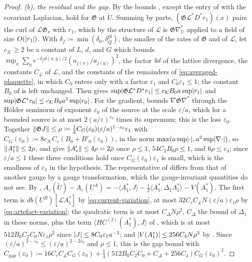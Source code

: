 \documentclass[11pt]{preprint}
\DeclarePairedDelimiter{\abs}{\lvert}{\rvert}
\DeclarePairedDelimiter{\norm}{\lVert}{\rVert}
\numberwithin{equation}{section}
\theoremstyle{definition}
\theoremstyle{remark}
\theoremstyle{plain}
\begin{document}
\begin{proof}
\emph{(b), the residual and the gap.} By \cite[Theorem~3.13, p.~426]{BalabanPBG} the bounds \cite[(3.42)--(3.47)]{BalabanPBG}, except the entry of \cite[(3.42)]{BalabanPBG} with the covariant Laplacian, hold for $\mathfrak G$ at $\tilde U$. Summing by parts, $(\mathfrak G\mathcal L^*D^*r_1)(x)$ pairs the curl of $\mathcal L\mathfrak G_x$ with $r_1$, which by the structure of $\mathcal L$ is $\mathfrak G\nabla^*_U$ applied to a field of size $O(\abs{r_1})$. With $\delta_f \coloneqq \min(\delta_0, \delta^{\mathrm{pl}}_Q)$, the smaller of the rates of $\mathfrak G$ and of $\mathcal L$, let $c_{\mathcal K} \geq 2$ be a constant of $L$, $d$, and $G$ which bounds $\sup_x\sum_ye^{-\delta_fd(x,y)/2}(a_{j(x)}/a_{j(y)})^2$, the factor $4d$ of the lattice divergence, the constants $C_{\mathcal L}$ of $\mathcal L$, and the constants of the remainders of \eqref{eq:averaged-plaquette}, in which $C_0$ enters only with a factor $\varepsilon_1$ and $C_0\varepsilon_1 \leq 1$; the constant $B_0$ of \cite[(3.42)]{BalabanPBG} is left unchanged. Then \cite[(3.42)]{BalabanPBG} gives $\sup\abs{\mathfrak G\mathcal L^*D^*r_1} \leq c_{\mathcal K}B_0a\sup\abs{r_1}$ and $\sup\abs{\mathfrak G\mathcal L^*r_0} \leq c_{\mathcal K}B_0a^2\sup\abs{r_0}$. For the gradient, \cite[(3.44)]{BalabanPBG} bounds $\nabla\mathfrak G\nabla^*$ through the H\"older seminorm of exponent $\varepsilon_0$ of the source at the scale $\varepsilon/a$, which for a bounded source is at most $2(a/\varepsilon)^{\varepsilon_0}$ times its supremum; this is the loss $\varepsilon_0$. Together $\norm{\mathfrak GJ} \leq \rho \coloneqq \frac12C_G(\varepsilon_0)(\varepsilon/a)^{1-\varepsilon_0}\varepsilon_1$ with $C_G(\varepsilon_0) \coloneqq 8c_{\mathcal K}C_r(B_0 + B'_0(\varepsilon_0))$, in the norm $\max(a\sup\abs\cdot, a^2\sup\abs{\nabla\cdot})$, so $\norm{A_1^*} \leq 2\rho$, and \cite[(57), (58), pp.~286--287]{BalabanVAR} give $\norm{A'_*} \leq 4\rho = 2\bar\rho$ once $\rho \leq 1$, $54C_2B_0\rho \leq 1$, and $6\rho \leq c_4$; since $\varepsilon/a \leq 1$ these three conditions hold once $C_G(\varepsilon_0)\varepsilon_1$ is small, which is the smallness of $\varepsilon_1$ in the hypothesis. The representative of \cite[Proposition~5]{BalabanVAR} differs from that of another gauge by a gauge transformation, which the gauge-invariant quantities do not see. By \cite[(81)]{BalabanVAR}, $A_\varepsilon(\tilde U) - A_\varepsilon(U^A) = -\langle A_1^*, J\rangle - \frac12\langle A_1^*, \Delta_1A_1^*\rangle - V(A_1^*)$. The first term is $db(U^B)[\mathcal LA_1^*]$ by \eqref{eq:current-variation}, at most $32C_rC_{\mathcal L}N(\varepsilon/a)\varepsilon_1\rho$ by \eqref{eq:artefact-variation}; the quadratic term is at most $C_\Delta N\rho^2$, $C_\Delta$ the bound of $\Delta_1$ in these norms, plus the term $\langle HC^{(2)}(A_1^*), J\rangle$ of \cite[(79)]{BalabanVAR}, which is at most $512B_0C_2C_0N\varepsilon_1\rho^2$ since $\abs J \leq 8C_0\varepsilon_1a^{-3}$; and $\abs{V(A_1^*)} \leq 256C_4N\rho^3$ by \cite[Proposition~4, (97)]{BalabanVAR}. Since $(\varepsilon/a)^{2-\varepsilon_0} \leq (\varepsilon/a)^{2-2\varepsilon_0}$ and $\rho \leq 1$, this is the gap bound with $C_{\mathrm{gap}}(\varepsilon_0) \coloneqq 16C_rC_{\mathcal L}C_G(\varepsilon_0) + \frac14(512B_0C_2C_0 + C_\Delta + 256C_4)C_G(\varepsilon_0)^2$.


\end{proof}
\end{document}
